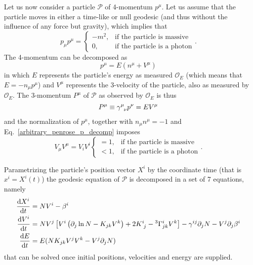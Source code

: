 Let us now consider a particle $\mathcal{P}$ of 4-momentum $p^\mu$. Let us assume that the particle moves in either a time-like or null geodesic (and thus without the influence of any force but gravity), which implies that
%
\begin{equation}
  p_\mu p^\mu = \left\{
  \begin{array}{lr}
    -m^2, & \text{if the particle is massive}  \\
    0,    & \text{if the particle is a photon}
  \end{array}
  \right. .
  \label{eq:arbitrary_penrose_p_norm}
\end{equation}
%
The 4-momentum can be decomposed as
%
\begin{equation}
  p^\mu = E(n^\mu + V^\mu)
  \label{arbitrary_penrose_p_decomp}
\end{equation}
%
in which $E$ represents the particle's energy as measured $\mathcal{O}_E$ (which means that $E = - n_\mu p^\mu$) and $V^\mu$ represents the 3-velocity of the particle, also as measured by $\mathcal{O}_E$. The 3-momentum $P^\mu$ of $\mathcal{P}$ as observed by $\mathcal{O}_E$ is thus
%
\begin{equation}
  P^\mu \equiv \tens{\gamma}{\mu}{\nu} p^\nu = E V^\mu
  \label{arbitrary_penrose_3_momentum}
\end{equation}
%
and the normalization of $p^\mu$, together with $n_\mu n^\mu = -1$ and Eq.~\eqref{arbitrary_penrose_p_decomp} imposes
%
\begin{equation}
  V_\mu V^\mu = V_i V^i \left\{
  \begin{array}{lr}
    = 1, & \text{if the particle is massive}  \\
    < 1, & \text{if the particle is a photon}
  \end{array}
  \right. .
  \label{eq:arbitrary_penrose_V_norm}
\end{equation}

Parametrizing the particle's position vector $X^i$ by the coordinate time (that is $x^i = X^i(t)$) the geodesic equation of $\mathcal{P}$ is decomposed in a set of 7 equations, namely
%
\begin{align}
  \der{X^i}{t} & = N V^i - \beta^i \label{eq:arbitrary_penrose_geodesic_eq_X}                                                                                                                                                  \\
  \der{V^i}{t} & = N V^j\left[ V^i \left( \partial_j \ln N - K_{jk} V^k \right) + 2 \tens{K}{i}{j} - {}^3\Gamma^{i}_{jk}V^k\right] - \gamma^{ij}\partial_j N - V^j\partial_j\beta^i \label{eq:arbitrary_penrose_geodesic_eq_V} \\
  \der{E}{t}   & = E (N K_{jk} V^j V^k - V^j \partial_j N) \label{eq:arbitrary_penrose_geodesic_eq_E}
\end{align}
%
that can be solved once initial positions, velocities and energy are supplied.

